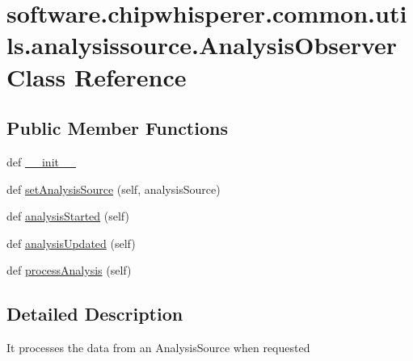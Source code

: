 \hypertarget{classsoftware_1_1chipwhisperer_1_1common_1_1utils_1_1analysissource_1_1AnalysisObserver}{}\section{software.\+chipwhisperer.\+common.\+utils.\+analysissource.\+Analysis\+Observer Class Reference}
\label{classsoftware_1_1chipwhisperer_1_1common_1_1utils_1_1analysissource_1_1AnalysisObserver}
\subsection*{Public Member Functions}
\begin{DoxyCompactItemize}
\item 
def \hyperlink{classsoftware_1_1chipwhisperer_1_1common_1_1utils_1_1analysissource_1_1AnalysisObserver_acff0e2d612f4a2ddb6e7ab4d469cd488}{\+\_\+\+\_\+init\+\_\+\+\_\+}
\item 
def \hyperlink{classsoftware_1_1chipwhisperer_1_1common_1_1utils_1_1analysissource_1_1AnalysisObserver_a3425f89ca10d5fec49bba248c88e9c1d}{set\+Analysis\+Source} (self, analysis\+Source)
\item 
def \hyperlink{classsoftware_1_1chipwhisperer_1_1common_1_1utils_1_1analysissource_1_1AnalysisObserver_a7565146f84c8b4c93724fd070ce2dbc0}{analysis\+Started} (self)
\item 
def \hyperlink{classsoftware_1_1chipwhisperer_1_1common_1_1utils_1_1analysissource_1_1AnalysisObserver_a61b42322a68fb1b3f17abfd114947e17}{analysis\+Updated} (self)
\item 
def \hyperlink{classsoftware_1_1chipwhisperer_1_1common_1_1utils_1_1analysissource_1_1AnalysisObserver_afb954c0f5a5a2031ede490e99990a4cf}{process\+Analysis} (self)
\end{DoxyCompactItemize}


\subsection{Detailed Description}
\begin{DoxyVerb}It processes the data from an AnalysisSource when requested \end{DoxyVerb}
 


